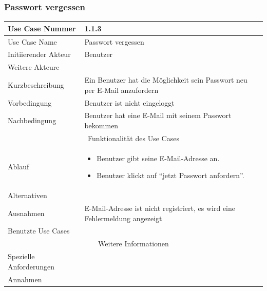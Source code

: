 \documentclass[10pt,a4paper]{article}
\begin{document}
\subsubsection{Passwort vergessen}
	\begin{tabular}{|l|p{.5\linewidth}|}
	\hline Use Case Nummer & 1.1.3 \\ 
	\hline Use Case Name & Passwort vergessen \\ 
	\hline Initiierender Akteur & Benutzer \\
	\hline Weitere Akteure &  \\
	\hline Kurzbeschreibung & Ein Benutzer hat die M\"oglichkeit sein Passwort neu per E-Mail anzufordern \\
	\hline Vorbedingung & Benutzer ist nicht eingeloggt \\
	\hline Nachbedingung & Benutzer hat eine E-Mail mit seinem Passwort bekommen \\
	\hline \multicolumn{2}{|c|}{Funktionalität des Use Cases}\\
	\hline Ablauf & \begin{itemize}
		\item Benutzer gibt seine E-Mail-Adresse an.
		\item Benutzer klickt auf ``jetzt Passwort anfordern''.
	\end{itemize} \\
	\hline Alternativen &  \\
	\hline Ausnahmen & E-Mail-Adresse ist nicht registriert, es wird eine Fehlermeldung angezeigt \\
	\hline Benutzte Use Cases &  \\
	\hline \multicolumn{2}{|c|}{Weitere Informationen} \\
	\hline Spezielle Anforderungen &  \\
	\hline Annahmen &  \\
	\hline
\end{tabular}
\end{document}
